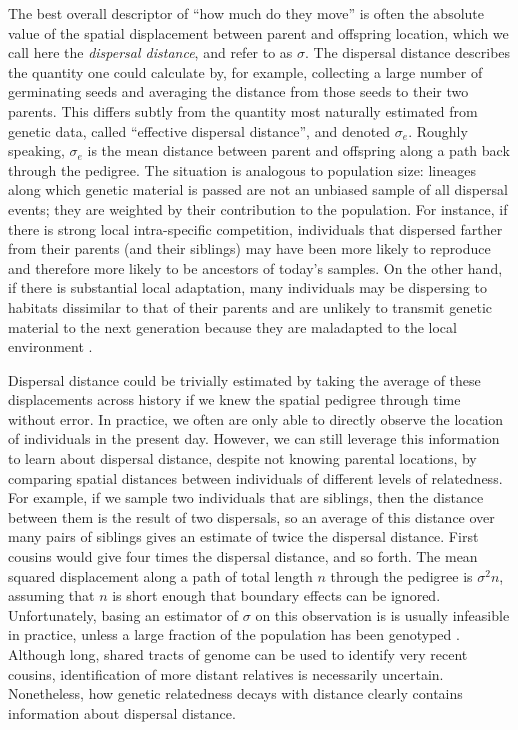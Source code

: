 \documentclass{ar-1col}
\begin{document}
The best overall descriptor of ``how much do they move''
is often the absolute value of the spatial displacement between parent and offspring location,
which we call here the \textit{dispersal distance}, 
and refer to as $\sigma$.
The dispersal distance describes the quantity one could calculate by,
for example, collecting a large number of germinating seeds
and averaging the distance from those seeds to their two parents.
This differs subtly from the quantity most naturally estimated from genetic data,
called ``effective dispersal distance'', and denoted $\sigma_e$.
Roughly speaking, $\sigma_e$ is
the mean distance between parent and offspring along a path back through the pedigree.
The situation is analogous to population size:
lineages along which genetic material is passed are not an unbiased sample of all dispersal events;
they are weighted by their contribution to the population.
For instance, if there is strong local intra-specific competition,
individuals that dispersed farther from their parents (and their siblings)
may have been more likely to reproduce and therefore more likely to be ancestors of today's samples.
On the other hand, if there is substantial local adaptation,
many individuals may be dispersing to habitats dissimilar to that of their parents
and are unlikely to transmit genetic material to the next generation
because they are maladapted to the local environment
\citep[for a review, see][]{wangbradburd2014}.

Dispersal distance could be trivially estimated by taking
the average of these displacements across history
if we knew the spatial pedigree through time without error.
In practice, we often are only able to directly observe
the location of individuals in the present day.
However, we can still leverage this information to learn about dispersal distance,
despite not knowing parental locations, 
by comparing spatial distances between individuals of different levels of relatedness.
For example, if we sample two individuals that are siblings,
then the distance between them is the result of two dispersals,
so an average of this distance over many pairs of siblings 
gives an estimate of twice the dispersal distance.
First cousins would give four times the dispersal distance, and so forth.
The mean squared displacement along
a path of total length $n$ through the pedigree is $\sigma^2 n$,
assuming that $n$ is short enough that boundary effects can be ignored.
Unfortunately, basing an estimator of $\sigma$ on this observation
is is usually infeasible in practice,
unless a large fraction of the population has been genotyped
\citep[e.g.,][]{Aguillon2017deconstructing}.
Although long, shared tracts of genome can be used to identify very recent cousins,
identification of more distant relatives is necessarily uncertain.
Nonetheless, how genetic relatedness decays with distance
clearly contains information about dispersal distance.
\end{document}

